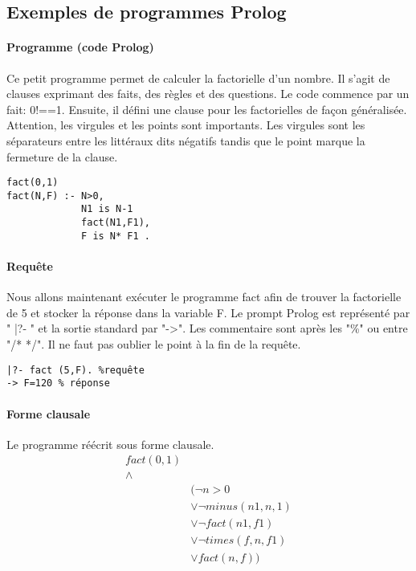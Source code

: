 
\author{Baptiste Degryse (27641200)}
\author{Charles Jacquet (27811200)}

\subsection{Exemples de programmes Prolog}

\paragraph{Programme (code Prolog)}
Ce petit programme permet de calculer la factorielle d'un nombre. Il s'agit de clauses exprimant des faits, des règles et des questions. Le code commence par un fait: 0!==1. Ensuite, il défini une clause pour les factorielles de façon généralisée. Attention, les virgules et les points sont importants. Les virgules sont les séparateurs entre les littéraux dits négatifs tandis que le point marque la fermeture de la clause.
\begin{verbatim}
fact(0,1)
fact(N,F) :- N>0, 
			 N1 is N-1 
			 fact(N1,F1), 
			 F is N* F1 .
\end{verbatim}
\paragraph{Requête} Nous allons maintenant exécuter le programme fact afin de trouver la factorielle de 5 et stocker la réponse dans la variable F. Le prompt Prolog est représenté par " |?- " et la sortie standard par "->". Les commentaire sont après les "\%" ou entre "/* */". Il ne faut pas oublier le point à la fin de la requête.
\begin{verbatim} 
|?- fact (5,F). %requête
-> F=120 % réponse
\end{verbatim}

\paragraph{Forme clausale}
Le programme réécrit sous forme clausale. 
\begin{align*}
fact(0,1) \\
 \wedge & \\
&( \neg n > 0 \\
&	\vee \neg minus( n1, n, 1) \\
&	\vee \neg fact(n1, f1) \\
&	\vee \neg times(f, n, f1) \\
&	\vee fact(n, f) ) \\
\end{align*}



